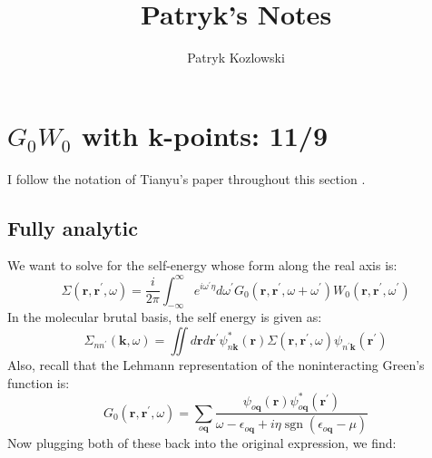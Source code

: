 \documentclass[12pt]{article}
\title{Patryk's Notes}
\author{Patryk Kozlowski}
\begin{document}
\setcounter{tocdepth}{3}  %
\tableofcontents
\clearpage  %

\maketitle

\section{$G_0W_0$ with k-points: 11/9}
I follow the notation of Tianyu's paper throughout this section \cite{Zhu2020-nt}.
\subsection{Fully analytic}
    We want to solve for the self-energy whose form along the real axis is:
    \begin{equation}
    \Sigma\left(\mathbf{r}, \mathbf{r}^{\prime}, \omega\right)=\frac{i}{2 \pi} \int_{-\infty}^{\infty} e^{i\omega ^{\prime}\eta }d \omega^{\prime} G_{0}\left(\mathbf{r}, \mathbf{r}^{\prime}, \omega+\omega^{\prime}\right) W_{0}\left(\mathbf{r}, \mathbf{r}^{\prime}, \omega^{\prime}\right)
    \end{equation}
    In the molecular brutal basis, the self energy is given as:
    \begin{equation}
        \Sigma_{n n^\prime}(\mathbf{k}, \omega) = \iint d \mathbf{r} d \mathbf{r}^\prime \psi_{n\mathbf{k}}^{*}(\mathbf{r}) \Sigma(\mathbf{r}, \mathbf{r}^\prime, \omega) \psi_{n^\prime\mathbf{k}}(\mathbf{r}^\prime)
    \end{equation}
    Also, recall that the Lehmann representation of the noninteracting Green's function is:
    \begin{equation}
        G_0\left(\mathbf{r}, \mathbf{r}^{\prime}, \omega\right)=\sum_{o \mathbf{q} } \frac{\psi_{o \mathbf{q}}(\mathbf{r}) \psi_{o \mathbf{q}}^{*}\left(\mathbf{r}^{\prime}\right)}{\omega-\epsilon_{o \mathbf{q}}+i \eta \operatorname{sgn}\left(\epsilon_{o \mathbf{q}}-\mu\right)}
    \end{equation}
    Now plugging both of these back into the original expression, we find:
\end{document}
